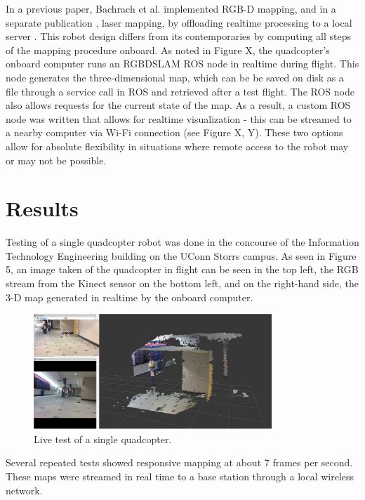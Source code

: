 \documentclass[letterpaper, oneside, 10pt]{report}
\begin{document}
In a previous paper, Bachrach et al. implemented RGB-D mapping, and in a separate publication \cite{bachrach2011range}, laser mapping, by offloading realtime processing to a local server \cite{bachrach2012estimation}.  This robot design differs from its contemporaries by computing all steps of the mapping procedure onboard. As noted in Figure X, the quadcopter's onboard computer runs an RGBDSLAM ROS node in realtime during flight. This node generates the three-dimensional map, which can be be saved on disk as a file through a service call in ROS and retrieved after a test flight. The ROS node also allows requests for the current state of the map. As a result, a custom ROS node was written that allows for realtime visualization - this can be streamed to a nearby computer via Wi-Fi connection (see Figure X, Y). These two options allow for absolute flexibility in situations where remote access to the robot may or may not be possible.

\section{Results}
\noindent Testing of a single quadcopter robot was done in the concourse of the Information Technology Engineering building on the UConn Storrs campus. As seen in Figure 5, an image taken of the quadcopter in flight can be seen in the top left, the RGB stream from the Kinect sensor on the bottom left, and on the right-hand side, the 3-D map generated in realtime by the onboard computer.

\begin{figure}[h]
 \caption{Live test of a single quadcopter.}
 \centering
   \includegraphics[width=0.8\textwidth]{images/single_test}
\end{figure}

\noindent Several repeated tests showed responsive mapping at about 7 frames per second. These maps were streamed in real time to a base station through a local wireless network.
\end{document}
